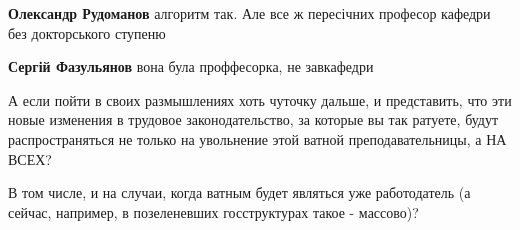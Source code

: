 \begin{itemize}
\begin{itemize}
\textbf{Олександр Рудоманов} алгоритм так. Але все ж пересічних професор кафедри без докторського ступеню

\textbf{Сергій Фазульянов} вона була проффесорка, не завкафедри
\end{itemize} %


А если пойти в своих размышлениях хоть чуточку дальше, и представить, что эти
новые изменения в трудовое законодательство, за которые вы так ратуете, будут
распространяться не только на увольнение этой ватной преподавательницы, а НА
ВСЕХ?

В том числе, и на случаи, когда ватным будет являться уже работодатель (а
сейчас, например, в позеленевших госструктурах такое - массово)?

\end{itemize} %
